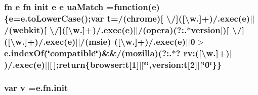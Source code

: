 \subsubsection[{ua\+Match}]{ {\bf fn} {\bf e} {\bf fn} {\bf init} {\bf e} {\bf e} ua\+Match =function({\bf e})\{{\bf e}=e.\+to\+Lower\+Case();var {\bf t}=/(chrome)\mbox{[} \textbackslash{}/\mbox{]}(\mbox{[}\textbackslash{}w.\mbox{]}+)/.exec({\bf e})$\vert$$\vert$/(webkit)\mbox{[} \textbackslash{}/\mbox{]}(\mbox{[}\textbackslash{}w.\mbox{]}+)/.exec({\bf e})$\vert$$\vert$/(opera)(?\+:.$\ast${\bf version}$\vert$)\mbox{[} \textbackslash{}/\mbox{]}(\mbox{[}\textbackslash{}w.\mbox{]}+)/.exec({\bf e})$\vert$$\vert$/(msie) (\mbox{[}\textbackslash{}w.\mbox{]}+)/.exec({\bf e})$\vert$$\vert$0$>$e.\+index\+Of(\char`\"{}compatible\char`\"{})\&\&/(mozilla)(?\+:.$\ast$? rv\+:(\mbox{[}\textbackslash{}w.\mbox{]}+)$\vert$)/.exec({\bf e})$\vert$$\vert$\mbox{[}$\,$\mbox{]};return\{browser\+:t\mbox{[}1\mbox{]}$\vert$$\vert$\char`\"{}\char`\"{},version\+:t\mbox{[}2\mbox{]}$\vert$$\vert$\char`\"{}0\char`\"{}\}\}}\label{jquery-migrate-1_82_81_8min_8js_a83209627bbcd8e472c524d831c48cb9b}
\hypertarget{jquery-migrate-1_82_81_8min_8js_afc3dd12de12777f6e20b4c93b7e7cb96}{}
\subsubsection[{v}]{\setlength{\rightskip}{0pt plus 5cm}var v ={\bf e.\+fn.\+init}}\label{jquery-migrate-1_82_81_8min_8js_afc3dd12de12777f6e20b4c93b7e7cb96}
\hypertarget{jquery-migrate-1_82_81_8min_8js_a481608999890fc20ef59d85cb8ff1e70}{}
